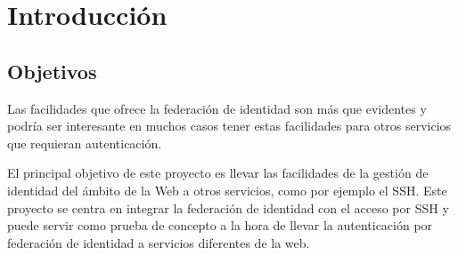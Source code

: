 \chapter{Introducción}
\section{Objetivos}

Las facilidades que ofrece la federación de identidad son más que
evidentes y podría ser interesante en muchos casos tener estas
facilidades para otros servicios que requieran autenticación.

El principal objetivo de este proyecto es llevar las facilidades de la
gestión de identidad del ámbito de la Web a otros servicios, como por
ejemplo el SSH. Este proyecto se centra en integrar la
federación de identidad con el acceso por SSH y puede servir como
prueba de concepto a la hora de llevar la autenticación por federación
de identidad a servicios diferentes de la web.

